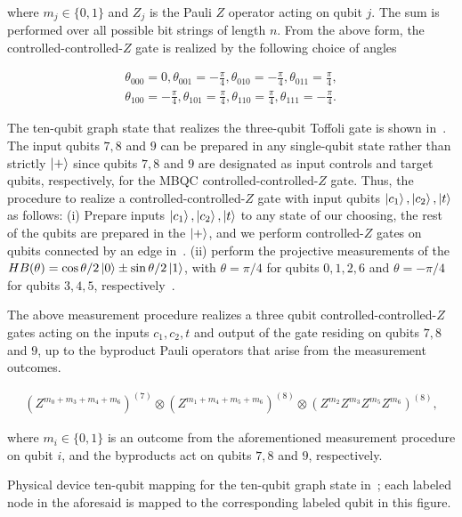 \noindent
where $m_j \in \{0, 1\}$ and $Z_j$ is the Pauli $Z$ operator acting on qubit $j$. The sum is performed over all possible bit strings of length $n$. From the above form, the controlled-controlled-$Z$ gate is realized by the following choice of angles

\begin{align}
	\theta_{000} = 0, \theta_{001} = -\frac{\pi}{4}, \theta_{010} = -\frac{\pi}{4}, \theta_{011} = \frac{\pi}{4}, \nonumber \\
	\theta_{100} = -\frac{\pi}{4}, \theta_{101} = \frac{\pi}{4}, \theta_{110} = \frac{\pi}{4}, \theta_{111} = -\frac{\pi}{4}.
\end{align}

\noindent
The ten-qubit graph state that realizes the three-qubit Toffoli gate is shown in~. The input qubits $7,8$ and $9$ can be prepared in any single-qubit state rather than strictly $\ket{+}$ since qubits $7,8$ and $9$ are designated as input controls and target qubits, respectively, for the \acs{MBQC} controlled-controlled-$Z$ gate. Thus, the procedure to realize a controlled-controlled-$Z$ gate with input qubits $\ket{c_1}, \ket{c_2}, \ket{t}$ as follows: (i) Prepare inputs $\ket{c_1}, \ket{c_2}, \ket{t}$ to any state of our choosing, the rest of the qubits are prepared in the $\ket{+}$, and we perform controlled-$Z$ gates on qubits connected by an edge in~. (ii) perform the projective measurements of the $H B(\theta) = \cos{\theta/2}\ket{0}\pm \sin{\theta/2}\ket{1}$, with $\theta=\pi/4$ for qubits $0, 1, 2, 6$ and $\theta=-\pi/4$ for qubits $3,4,5$, respectively~\cite{Browne_2016}. 

\noindent
The above measurement procedure realizes a three qubit controlled-controlled-$Z$ gates acting on the inputs $c_1, c_2, t$ and output of the gate residing on qubits $7,8$ and $9$, up to the byproduct Pauli operators that arise from the measurement outcomes.

\begin{align}
	(Z^{m_0+ m_3 + m_4+m_6})^{(7)} \otimes (Z^{m_1+ m_4+m_5+m_6})^{(8)} \otimes (Z^{m_2}Z^{m_3}Z^{m_5}Z^{m_6})^{(8)},
\end{align}

\noindent
where $m_i \in \{0, 1\}$ is an outcome from the aforementioned measurement procedure on qubit $i$, and the byproducts act on qubits $7,8$ and $9$, respectively.

\begin{marginfigure}
	\centering
    \caption[Physical device ten-qubit mapping for the ten-qubit graph state in~\protect{}.]{Physical device ten-qubit mapping for the ten-qubit graph state in~\protect{}; each labeled node in the aforesaid is mapped to the corresponding labeled qubit in this figure.}
\end{marginfigure}

